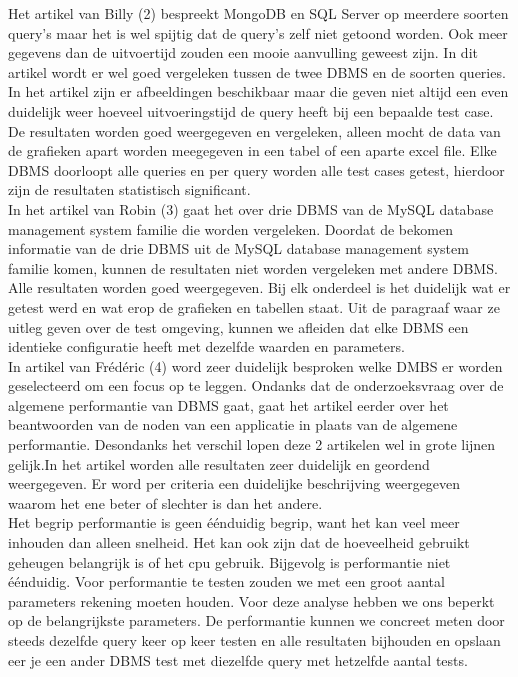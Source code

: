\documentclass[fleqn,10pt]{artikeltin}
\begin{document}
Het artikel van Billy (2) bespreekt MongoDB en SQL Server op meerdere soorten query’s maar het is wel spijtig dat de query’s zelf niet getoond worden. Ook meer gegevens dan de uitvoertijd zouden een mooie aanvulling geweest zijn. In dit artikel wordt er wel goed vergeleken tussen de twee DBMS en de soorten queries. In het artikel zijn er afbeeldingen beschikbaar maar die geven niet altijd een even duidelijk weer hoeveel uitvoeringstijd de query heeft bij een bepaalde test case. De resultaten worden goed weergegeven en vergeleken, alleen mocht de data van de grafieken apart worden meegegeven in een tabel of een aparte excel file. Elke DBMS doorloopt alle queries en per query worden alle test cases getest, hierdoor zijn de resultaten statistisch significant.\\

In het artikel van Robin (3) gaat het over drie DBMS van de MySQL database management system familie die worden vergeleken. Doordat de bekomen informatie van de drie DBMS uit de MySQL database management system familie komen, kunnen de resultaten niet worden vergeleken met andere DBMS. Alle resultaten worden goed weergegeven. Bij elk onderdeel is het duidelijk wat er getest werd en wat erop de grafieken en tabellen staat. Uit de paragraaf waar ze uitleg geven over de test omgeving, kunnen we afleiden dat elke DBMS een identieke configuratie heeft met dezelfde waarden en parameters.\\

In artikel van Frédéric (4) word zeer duidelijk besproken welke DMBS er worden geselecteerd om een focus op te leggen. Ondanks dat de onderzoeksvraag over de algemene performantie van DBMS gaat, gaat het artikel eerder over het beantwoorden van de noden van een applicatie in plaats van de algemene performantie. Desondanks het verschil lopen deze 2 artikelen wel in grote lijnen gelijk.In het artikel worden alle resultaten zeer duidelijk en geordend weergegeven. Er word per criteria een duidelijke beschrijving weergegeven waarom het ene beter of slechter is dan het andere.\\

Het begrip performantie is geen éénduidig begrip, want het kan veel meer inhouden dan alleen snelheid. Het kan ook zijn dat de hoeveelheid gebruikt geheugen belangrijk is of het cpu gebruik. Bijgevolg is performantie niet éénduidig. Voor performantie te testen zouden we met een groot aantal parameters rekening moeten houden. Voor deze analyse hebben we ons beperkt op de belangrijkste parameters. De performantie kunnen we concreet meten door steeds dezelfde query keer op keer testen en alle resultaten bijhouden en opslaan eer je een ander DBMS test met diezelfde query met hetzelfde aantal tests.
\end{document}
